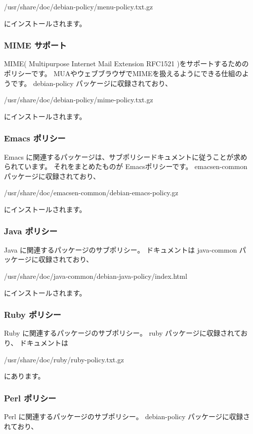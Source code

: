 \documentclass[mingoth,a4paper]{jsarticle}
\begin{document}
        /usr/share/doc/debian-policy/menu-policy.txt.gz

        にインストールされます。

    \subsubsection{MIME サポート}
        MIME( Multipurpose Internet Mail Extension RFC1521 )をサポートするためのポリシーです。
        MUAやウェブブラウザでMIMEを扱えるようにできる仕組のようです。
        debian-policy パッケージに収録されており、

        /usr/share/doc/debian-policy/mime-policy.txt.gz

        にインストールされます。

    \subsubsection{Emacs ポリシー}
        Emacs に関連するパッケージは、サブポリシードキュメントに従うことが求められています。
        それをまとめたものが Emacsポリシーです。
        emacsen-common パッケージに収録されており、

        /usr/share/doc/emacsen-common/debian-emacs-policy.gz

        にインストールされます。

    \subsubsection{Java ポリシー}
        Java に関連するパッケージのサブポリシー。
        ドキュメントは
        java-common パッケージに収録されており、

        /usr/share/doc/java-common/debian-java-policy/index.html

        にインストールされます。

    \subsubsection{Ruby ポリシー}
        Ruby に関連するパッケージのサブポリシー。
        ruby パッケージに収録されており、
        ドキュメントは

        /usr/share/doc/ruby/ruby-policy.txt.gz

	にあります。

    \subsubsection{Perl ポリシー}
        Perl に関連するパッケージのサブポリシー。
        debian-policy パッケージに収録されており、
\end{document}
